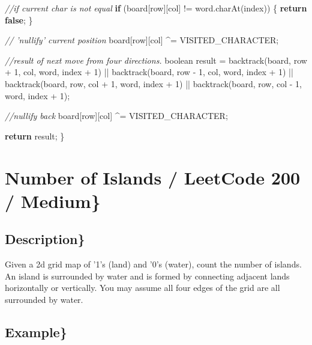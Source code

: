 \documentclass[]{book}
\newenvironment{Shaded}{\begin{snugshade}}{\end{snugshade}}
\newcommand{\CommentTok}[1]{\textcolor[rgb]{0.56,0.35,0.01}{\textit{#1}}}
\newcommand{\DataTypeTok}[1]{\textcolor[rgb]{0.13,0.29,0.53}{#1}}
\newcommand{\DecValTok}[1]{\textcolor[rgb]{0.00,0.00,0.81}{#1}}
\newcommand{\FunctionTok}[1]{\textcolor[rgb]{0.00,0.00,0.00}{#1}}
\newcommand{\KeywordTok}[1]{\textcolor[rgb]{0.13,0.29,0.53}{\textbf{#1}}}
\newcommand{\NormalTok}[1]{#1}
\begin{document}
\begin{Shaded}
\begin{Highlighting}[]
    \CommentTok{//if current char is not equal}
    \KeywordTok{if}\NormalTok{ (board[row][col] != word.}\FunctionTok{charAt}\NormalTok{(index)) \{}
        \KeywordTok{return} \KeywordTok{false}\NormalTok{;}
\NormalTok{    \}}

    \CommentTok{// 'nullify' current position}
\NormalTok{    board[row][col] ^= VISITED_CHARACTER;}

    \CommentTok{//result of next move from four directions.}
    \DataTypeTok{boolean}\NormalTok{ result = }\FunctionTok{backtrack}\NormalTok{(board, row + }\DecValTok{1}\NormalTok{, col, word, index + }\DecValTok{1}\NormalTok{)}
\NormalTok{                || }\FunctionTok{backtrack}\NormalTok{(board, row - }\DecValTok{1}\NormalTok{, col, word, index + }\DecValTok{1}\NormalTok{)}
\NormalTok{                || }\FunctionTok{backtrack}\NormalTok{(board, row, col + }\DecValTok{1}\NormalTok{, word, index + }\DecValTok{1}\NormalTok{)}
\NormalTok{                || }\FunctionTok{backtrack}\NormalTok{(board, row, col - }\DecValTok{1}\NormalTok{, word, index + }\DecValTok{1}\NormalTok{);}

    \CommentTok{//nullify back}
\NormalTok{    board[row][col] ^= VISITED_CHARACTER;}

    \KeywordTok{return}\NormalTok{ result;}
\NormalTok{\}}
\end{Highlighting}
\end{Shaded}

\hypertarget{number-of-islands-leetcode-200-medium}{%
\section{Number of Islands / LeetCode 200 / Medium\}}\label{number-of-islands-leetcode-200-medium}}

\hypertarget{description-48}{%
\subsection{Description\}}\label{description-48}}

Given a 2d grid map of '1's (land) and '0's (water), count the number of islands. An island is surrounded by water
and is formed by connecting adjacent lands horizontally or vertically. You may assume all four edges of the grid are
all surrounded by water.

\hypertarget{example-46}{%
\subsection{Example\}}\label{example-46}}
\end{document}
